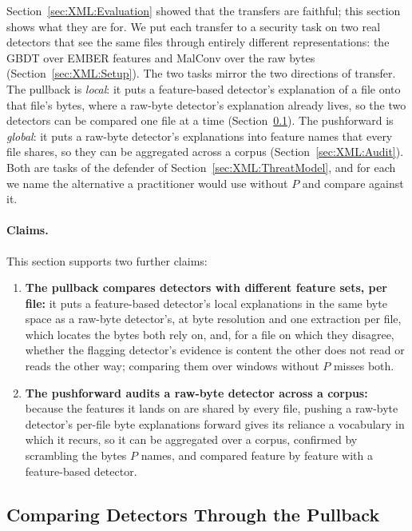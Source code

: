 Section~\ref{sec:XML:Evaluation} showed that the transfers are faithful; this section shows what they are for. We put each transfer to a security task on two real detectors that see the same files through entirely different representations: the GBDT over EMBER features and MalConv over the raw bytes (Section~\ref{sec:XML:Setup}). The two tasks mirror the two directions of transfer. The pullback is \emph{local}: it puts a feature-based detector's explanation of a file onto that file's bytes, where a raw-byte detector's explanation already lives, so the two detectors can be compared one file at a time (Section~\ref{sec:XML:Comparison}). The pushforward is \emph{global}: it puts a raw-byte detector's explanations into feature names that every file shares, so they can be aggregated across a corpus (Section~\ref{sec:XML:Audit}). Both are tasks of the defender of Section~\ref{sec:XML:ThreatModel}, and for each we name the alternative a practitioner would use without $P$ and compare against it.

\paragraph{Claims.} This section supports two further claims:
\begin{enumerate}[noitemsep, topsep=2pt, start=3]
    \item \textbf{The pullback compares detectors with different feature sets, per file:} it puts a feature-based detector's local explanations in the same byte space as a raw-byte detector's, at byte resolution and one extraction per file, which locates the bytes both rely on, and, for a file on which they disagree, whether the flagging detector's evidence is content the other does not read or reads the other way; comparing them over windows without $P$ misses both.
    \item \textbf{The pushforward audits a raw-byte detector across a corpus:} because the features it lands on are shared by every file, pushing a raw-byte detector's per-file byte explanations forward gives its reliance a vocabulary in which it recurs, so it can be aggregated over a corpus, confirmed by scrambling the bytes $P$ names, and compared feature by feature with a feature-based detector.
\end{enumerate}

\subsection{Comparing Detectors Through the Pullback}
\label{sec:XML:Comparison}


